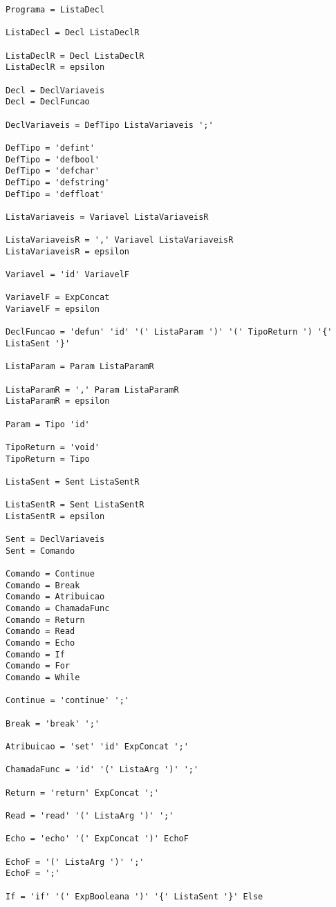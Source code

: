 \documentclass[
  12pt,				%
  oneside,			%
  a4paper,			%
  english,			%
  french,				%
  spanish,			%
  brazil,				%
]{abntex2}
\begin{document}
\begin{lstlisting}[label={code:gramatica-original},caption={Gramática
    original da linguagem de programação LisC.},style={mystyle}]
Programa = ListaDecl

ListaDecl = Decl ListaDeclR

ListaDeclR = Decl ListaDeclR
ListaDeclR = epsilon

Decl = DeclVariaveis
Decl = DeclFuncao

DeclVariaveis = DefTipo ListaVariaveis ';'

DefTipo = 'defint'
DefTipo = 'defbool'
DefTipo = 'defchar'
DefTipo = 'defstring'
DefTipo = 'deffloat'

ListaVariaveis = Variavel ListaVariaveisR

ListaVariaveisR = ',' Variavel ListaVariaveisR
ListaVariaveisR = epsilon

Variavel = 'id' VariavelF

VariavelF = ExpConcat
VariavelF = epsilon

DeclFuncao = 'defun' 'id' '(' ListaParam ')' '(' TipoReturn ') '{' ListaSent '}'

ListaParam = Param ListaParamR

ListaParamR = ',' Param ListaParamR
ListaParamR = epsilon

Param = Tipo 'id'

TipoReturn = 'void'
TipoReturn = Tipo

ListaSent = Sent ListaSentR

ListaSentR = Sent ListaSentR
ListaSentR = epsilon

Sent = DeclVariaveis
Sent = Comando

Comando = Continue
Comando = Break
Comando = Atribuicao
Comando = ChamadaFunc
Comando = Return
Comando = Read
Comando = Echo
Comando = If
Comando = For
Comando = While

Continue = 'continue' ';'

Break = 'break' ';'

Atribuicao = 'set' 'id' ExpConcat ';'

ChamadaFunc = 'id' '(' ListaArg ')' ';'

Return = 'return' ExpConcat ';'

Read = 'read' '(' ListaArg ')' ';'

Echo = 'echo' '(' ExpConcat ')' EchoF

EchoF = '(' ListaArg ')' ';'
EchoF = ';'

If = 'if' '(' ExpBooleana ')' '{' ListaSent '}' Else


\end{lstlisting}
\end{document}
